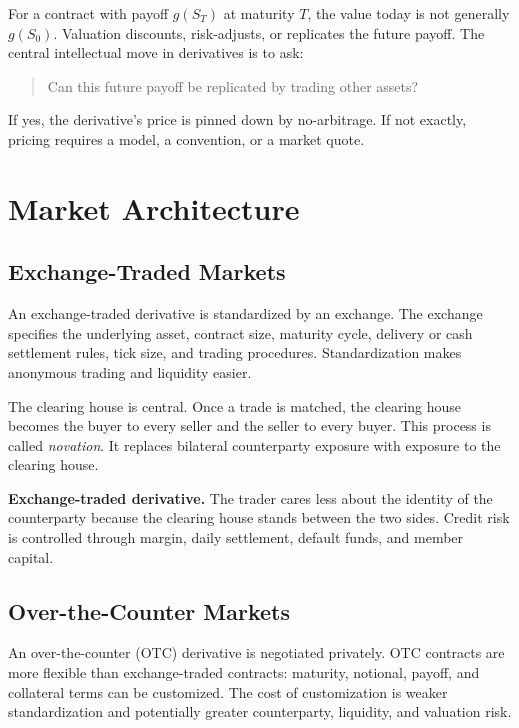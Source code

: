 For a contract with payoff $g(S_T)$ at maturity $T$, the value today is not
generally $g(S_0)$. Valuation discounts, risk-adjusts, or replicates the future
payoff. The central intellectual move in derivatives is to ask:

\begin{quote}
Can this future payoff be replicated by trading other assets?
\end{quote}

If yes, the derivative's price is pinned down by no-arbitrage. If not exactly,
pricing requires a model, a convention, or a market quote.

\section{Market Architecture}

\subsection{Exchange-Traded Markets}

An exchange-traded derivative is standardized by an exchange. The exchange
specifies the underlying asset, contract size, maturity cycle, delivery or cash
settlement rules, tick size, and trading procedures. Standardization makes
anonymous trading and liquidity easier.

The clearing house is central. Once a trade is matched, the clearing house
becomes the buyer to every seller and the seller to every buyer. This process is
called \emph{novation}. It replaces bilateral counterparty exposure with exposure
to the clearing house.

\begin{boxD}
\textbf{Exchange-traded derivative.} The trader cares less about the identity of
the counterparty because the clearing house stands between the two sides. Credit
risk is controlled through margin, daily settlement, default funds, and member
capital.
\end{boxD}

\subsection{Over-the-Counter Markets}

An over-the-counter (OTC) derivative is negotiated privately. OTC contracts are
more flexible than exchange-traded contracts: maturity, notional, payoff, and
collateral terms can be customized. The cost of customization is weaker
standardization and potentially greater counterparty, liquidity, and valuation
risk.

